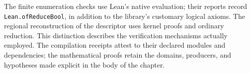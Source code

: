 The finite enumeration checks use Lean's native
evaluation; their reports record \texttt{Lean.}\allowbreak\texttt{of}\allowbreak\texttt{Reduce}\allowbreak\texttt{Bool}, in addition
to the library's customary logical axioms. The regional reconstruction
of the descriptor uses kernel proofs and ordinary
reduction. This distinction describes the verification mechanisms
actually employed. The compilation receipts attest to their declared modules
and dependencies; the mathematical proofs retain the
domains, producers, and hypotheses made explicit in the body
of the chapter.
